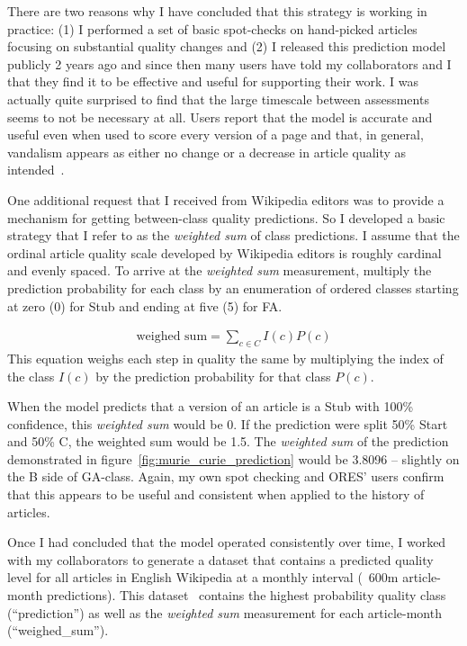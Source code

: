 There are two reasons why I have concluded that this strategy is working in practice:  (1) I performed a set of basic spot-checks on hand-picked articles focusing on substantial quality changes and (2) I released this prediction model publicly 2 years ago and since then many users have told my collaborators and I that they find it to be effective and useful for supporting their work.  I was actually quite surprised to find that the large timescale between assessments seems to not be necessary at all.  Users report that the model is accurate and useful even when used to score every version of a page and that, in general, vandalism appears as either no change or a decrease in article quality as intended~\cite{ross2016visualizaing}.

One additional request that I received from Wikipedia editors was to provide a mechanism for getting between-class quality predictions.  So I developed a basic strategy that I refer to as the \emph{weighted sum} of class predictions.  I assume that the ordinal article quality scale developed by Wikipedia editors is roughly cardinal and evenly spaced.  To arrive at the \emph{weighted sum} measurement, multiply the prediction probability for each class by an enumeration of ordered classes starting at zero (0) for Stub and ending at five (5) for FA.

\begin{equation} \label{eq:weighted_sum}
\begin{split}
\text{weighed sum} = \sum_{c \in C}{I(c)P(c)}
\end{split}
\end{equation}
This equation weighs each step in quality the same by multiplying the index of the class $I(c)$ by the prediction probability for that class $P(c)$.

When the model predicts that a version of an article is a Stub with 100\% confidence, this \emph{weighted sum} would be 0.  If the prediction were split 50\% Start and 50\% C, the weighted sum would be 1.5.  The \emph{weighted sum} of the prediction demonstrated in figure~\ref{fig:murie_curie_prediction} would be 3.8096 -- slightly on the B side of GA-class.  Again, my own spot checking and ORES' users confirm that this appears to be useful and consistent when applied to the history of articles.

Once I had concluded that the model operated consistently over time, I worked with my collaborators to generate a dataset that contains a predicted quality level for all articles in English Wikipedia at a monthly interval (~600m article-month predictions).  This dataset~\cite{halfaker16monthly} contains the highest probability quality class (``prediction'') as well as the \emph{weighted sum} measurement for each article-month (``weighed\_sum'').


